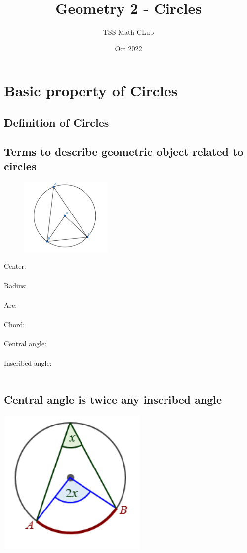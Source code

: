 \documentclass{article}
\title{Geometry 2 - Circles}
\author{TSS Math CLub}
\date{Oct 2022}
\begin{document}
\large

\maketitle

\section{Basic property of Circles}
\subsection{Definition of Circles}
\subsection{Terms to describe geometric object related to circles}
\begin{figure} %
    \centering
    \includegraphics[width=0.4\textwidth]{Picture1.png}
\end{figure}
Center: \\ \\
Radius: \\ \\
Arc: \\ \\
Chord: \\ \\
Central angle: \\ \\
Inscribed angle: \\ \\


\subsection{Central angle is twice any inscribed angle}
\includegraphics{Picture2.png}
\end{document}

